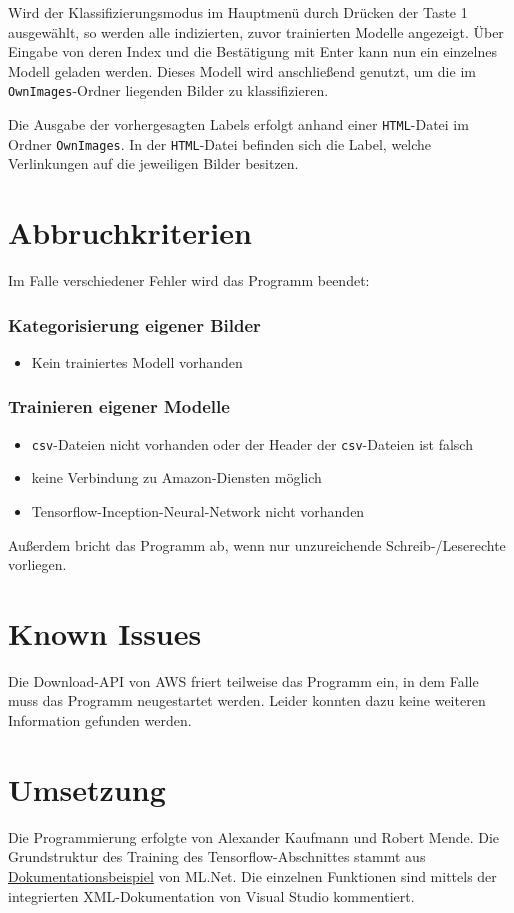 \documentclass[doktyp=parbeit]{TUBAFarbeiten}
\begin{document}
Wird der Klassifizierungsmodus im Hauptmenü durch Drücken der Taste 1 ausgewählt, so werden alle indizierten, zuvor trainierten Modelle angezeigt. Über Eingabe von deren Index und die Bestätigung mit Enter kann nun ein einzelnes Modell geladen werden. Dieses Modell wird anschließend genutzt, um die im \texttt{OwnImages}-Ordner liegenden Bilder zu klassifizieren. 

Die Ausgabe der vorhergesagten Labels erfolgt anhand einer \texttt{HTML}-Datei im Ordner \texttt{OwnImages}. In der \texttt{HTML}-Datei befinden sich die Label, welche Verlinkungen auf die jeweiligen Bilder besitzen.
\section{Abbruchkriterien}
Im Falle verschiedener Fehler wird das Programm beendet:
\subsubsection*{Kategorisierung eigener Bilder}
\begin{itemize}
	\item Kein trainiertes Modell vorhanden
\end{itemize}
\subsubsection*{Trainieren eigener Modelle}	
\begin{itemize}
	\item \texttt{csv}-Dateien nicht vorhanden oder der Header der \texttt{csv}-Dateien ist falsch
	\item keine Verbindung zu Amazon-Diensten möglich
	\item Tensorflow-Inception-Neural-Network nicht vorhanden
\end{itemize}
Außerdem bricht das Programm ab, wenn nur unzureichende Schreib-/Leserechte vorliegen.  
\section{Known Issues}
Die Download-API von AWS friert teilweise das Programm ein, in dem Falle muss das Programm neugestartet werden. Leider konnten dazu keine weiteren Information gefunden werden. 
\section{Umsetzung}
Die Programmierung erfolgte von Alexander Kaufmann und Robert Mende. Die Grundstruktur des Training des Tensorflow-Abschnittes stammt aus \href{https://docs.microsoft.com/de-de/dotnet/machine-learning/tutorials/image-classification}{Dokumentationsbeispiel} von ML.Net. Die einzelnen Funktionen sind mittels der integrierten XML-Dokumentation von Visual Studio kommentiert.  
\end{document}
